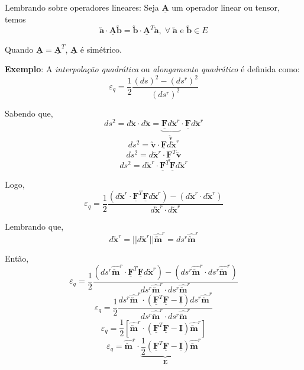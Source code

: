 	Lembrando sobre operadores lineares: Seja $\underline{\mathbf{A}}$ um operador linear ou tensor, temos
	\[\utilde{\mathbf{a}}\cdot\underline{\mathbf{A}}\utilde{\mathbf{b}}=\utilde{\mathbf{b}}\cdot\underline{\mathbf{A}}^T\utilde{\mathbf{a}},\;\forall\;\mathbf{\utilde{\mathbf{a}}}\text{ e }\mathbf{\utilde{\mathbf{b}}}\in\text{$E$}\]
	
	Quando $\underline{\mathbf{A}}=\underline{\mathbf{A}}^T$, $\underline{\mathbf{A}}$ é simétrico.
	
	\textbf{Exemplo}: A \textit{interpolação quadrática} ou \textit{alongamento quadrático} é definida como:
	\[\varepsilon_q=\frac{1}{2}\frac{(ds)^2-(ds^r)^2}{(ds^r)^2}\]
	
	Sabendo que,
	\[ds^2=d\utilde{\mathbf{x}}\cdot d\utilde{\mathbf{x}}=\underbrace{\underline{\mathbf{F}}d\utilde{\mathbf{x}}^r}_{\displaystyle\utilde{\mathbf{v}}}\cdot\underline{\mathbf{F}}d\utilde{\mathbf{x}}^r\]
	\[ds^2=\utilde{\mathbf{v}}\cdot\underline{\mathbf{F}}d\utilde{\mathbf{x}}^r\]
	\[ds^2=d\utilde{\mathbf{x}}^r\cdot\underline{\mathbf{F}}^T\utilde{\mathbf{v}}\]
	\[ds^2=d\utilde{\mathbf{x}}^r\cdot\underline{\mathbf{F}}^T\underline{\mathbf{F}}d\utilde{\mathbf{x}}^r\]
	
	Logo,
	\[\varepsilon_q=\frac{1}{2}\frac{(d\utilde{\mathbf{x}}^r\cdot\underline{\mathbf{F}}^T\underline{\mathbf{F}}d\utilde{\mathbf{x}}^r)-(d\utilde{\mathbf{x}}^r\cdot d\utilde{\mathbf{x}}^r)}{d\utilde{\mathbf{x}}^r\cdot d\utilde{\mathbf{x}}^r}\]
	
	Lembrando que,
	\[d\utilde{\mathbf{x}}^r=||d\utilde{\mathbf{x}}^r||\hat{\utilde{\mathbf{m}}}^r=ds^r\hat{\utilde{\mathbf{m}}}^r\]
	
	Então,
	\[\varepsilon_q=\frac{1}{2}\frac{(ds^r\hat{\utilde{\mathbf{m}}}^r\cdot\underline{\mathbf{F}}^T\underline{\mathbf{F}}d\utilde{\mathbf{x}}^r)-(ds^r\hat{\utilde{\mathbf{m}}}^r\cdot ds^r\hat{\utilde{\mathbf{m}}}^r)}{ds^r\hat{\utilde{\mathbf{m}}}^r\cdot ds^r\hat{\utilde{\mathbf{m}}}^r}\]
	\[\varepsilon_q=\frac{1}{2}\frac{ds^r\hat{\utilde{\mathbf{m}}}^r\cdot(\underline{\mathbf{F}}^T\underline{\mathbf{F}}-\underline{\mathbf{I}})ds^r\hat{\utilde{\mathbf{m}}}^r}{ds^r\hat{\utilde{\mathbf{m}}}^r\cdot ds^r\hat{\utilde{\mathbf{m}}}^r}\]
	\[\varepsilon_q=\frac{1}{2}[\hat{\utilde{\mathbf{m}}}^r\cdot(\underline{\mathbf{F}}^T\underline{\mathbf{F}}-\underline{\mathbf{I}})\hat{\utilde{\mathbf{m}}}^r]\]
	\[\varepsilon_q=\hat{\utilde{\mathbf{m}}}^r\cdot\underbrace{\frac{1}{2}(\underline{\mathbf{F}}^T\underline{\mathbf{F}}-\underline{\mathbf{I}})}_{\displaystyle\underline{\mathbf{E}}}\hat{\utilde{\mathbf{m}}}^r\]
	

